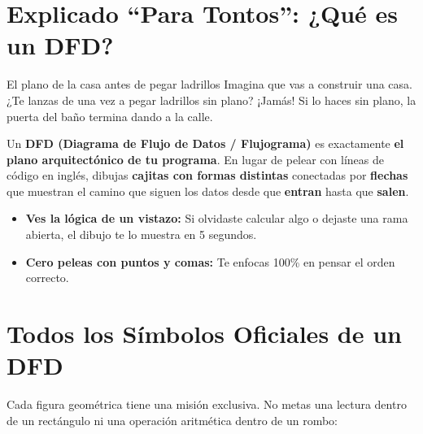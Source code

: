 \documentclass[11pt,letterpaper]{article}
\begin{document}
\section{Explicado ``Para Tontos'': ¿Qué es un DFD?}

\begin{paratontos}{El plano de la casa antes de pegar ladrillos}
Imagina que vas a construir una casa. ¿Te lanzas de una vez a pegar ladrillos sin plano? ¡Jamás! Si lo haces sin plano, la puerta del baño termina dando a la calle.

Un \textbf{DFD (Diagrama de Flujo de Datos / Flujograma)} es exactamente \textbf{el plano arquitectónico de tu programa}. En lugar de pelear con líneas de código en inglés, dibujas \textbf{cajitas con formas distintas} conectadas por \textbf{flechas} que muestran el camino que siguen los datos desde que \textbf{entran} hasta que \textbf{salen}.
\begin{itemize}
  \item \textbf{Ves la lógica de un vistazo:} Si olvidaste calcular algo o dejaste una rama abierta, el dibujo te lo muestra en 5 segundos.
  \item \textbf{Cero peleas con puntos y comas:} Te enfocas 100\% en pensar el orden correcto.
\end{itemize}
\end{paratontos}

\section{Todos los Símbolos Oficiales de un DFD}


Cada figura geométrica tiene una misión exclusiva. No metas una lectura dentro de un rectángulo ni una operación aritmética dentro de un rombo:
\end{document}
